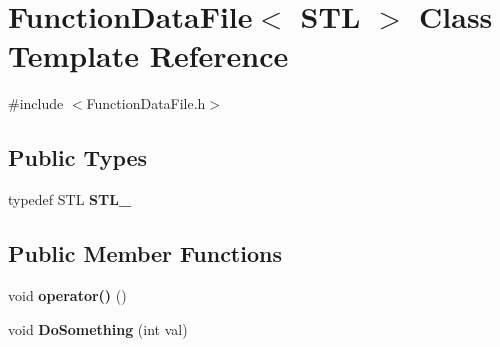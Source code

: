 \hypertarget{class_function_data_file}{\section{Function\-Data\-File$<$ S\-T\-L $>$ Class Template Reference}
\label{class_function_data_file}
}


{\ttfamily \#include $<$Function\-Data\-File.\-h$>$}

\subsection*{Public Types}
\begin{DoxyCompactItemize}
\item 
\hypertarget{class_function_data_file_a4892f7067be3c39a594661bf06fabc4f}{typedef S\-T\-L {\bfseries S\-T\-L\-\_\-}}\label{class_function_data_file_a4892f7067be3c39a594661bf06fabc4f}

\end{DoxyCompactItemize}
\subsection*{Public Member Functions}
\begin{DoxyCompactItemize}
\item 
\hypertarget{class_function_data_file_ad584839424b18fe70600ad61714a91d9}{void {\bfseries operator()} ()}\label{class_function_data_file_ad584839424b18fe70600ad61714a91d9}

\item 
\hypertarget{class_function_data_file_a928cae5899e85ea06bc14ec420a9650b}{void {\bfseries Do\-Something} (int val)}\label{class_function_data_file_a928cae5899e85ea06bc14ec420a9650b}

\end{DoxyCompactItemize}
